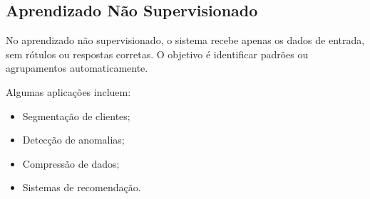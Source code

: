 \subsection{Aprendizado Não Supervisionado}

No aprendizado não supervisionado, o sistema recebe apenas os dados de entrada, sem rótulos
ou respostas corretas. O objetivo é identificar padrões ou agrupamentos automaticamente.

Algumas aplicações incluem:

\begin{itemize}
    \item Segmentação de clientes;
    \item Detecção de anomalias;
    \item Compressão de dados;
    \item Sistemas de recomendação.
\end{itemize} 